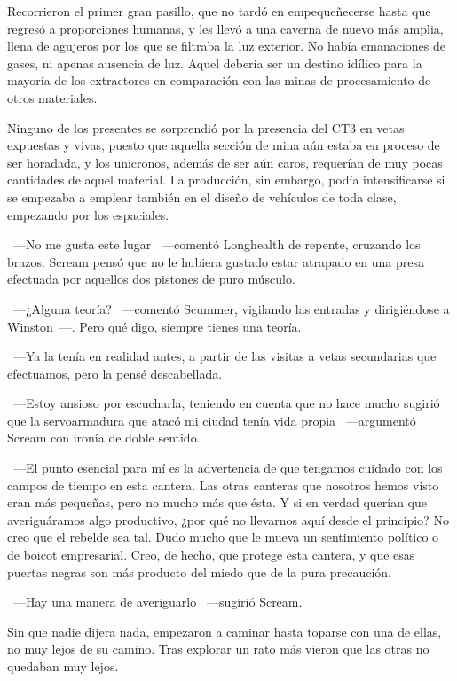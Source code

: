 Recorrieron el primer gran pasillo, que no tardó en empequeñecerse hasta que regresó a proporciones humanas, y les llevó a una caverna de nuevo más amplia, llena de agujeros por los que se filtraba la luz exterior. No había emanaciones de gases, ni apenas ausencia de luz. Aquel debería ser un destino idílico para la mayoría de los extractores en comparación con las minas de procesamiento de otros materiales.

Ninguno de los presentes se sorprendió por la presencia del CT3 en vetas expuestas y vivas, puesto que aquella sección de mina aún estaba en proceso de ser horadada, y los unicronos, además de ser aún caros, requerían de muy pocas cantidades de aquel material. La producción, sin embargo, podía intensificarse si se empezaba a emplear también en el diseño de vehículos de toda clase, empezando por los espaciales.

~---No me gusta este lugar ~---comentó Longhealth de repente, cruzando los brazos. Scream pensó que no le hubiera gustado estar atrapado en una presa efectuada por aquellos dos pistones de puro músculo.

~---¿Alguna teoría? ~---comentó Scummer, vigilando las entradas y dirigiéndose a Winston~---. Pero qué digo, siempre tienes una teoría.

~---Ya la tenía en realidad antes, a partir de las visitas a vetas secundarias que efectuamos, pero la pensé descabellada.

~---Estoy ansioso por escucharla, teniendo en cuenta que no hace mucho sugirió que la servoarmadura que atacó mi ciudad tenía vida propia ~---argumentó Scream con ironía de doble sentido.

~---El punto esencial para mí es la advertencia de que tengamos cuidado con los campos de tiempo en esta cantera. Las otras canteras que nosotros hemos visto eran más pequeñas, pero no mucho más que ésta. Y si en verdad querían que averiguáramos algo productivo, ¿por qué no llevarnos aquí desde el principio? No creo que el rebelde sea tal. Dudo mucho que le mueva un sentimiento político o de boicot empresarial. Creo, de hecho, que protege esta cantera, y que esas puertas negras son más producto del miedo que de la pura precaución.

~---Hay una manera de averiguarlo ~---sugirió Scream.

Sin que nadie dijera nada, empezaron a caminar hasta toparse con una de ellas, no muy lejos de su camino. Tras explorar un rato más vieron que las otras no quedaban muy lejos.

